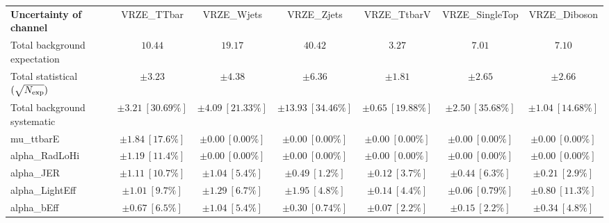 
\begin{sidewaystable}
\begin{center}
\setlength{\tabcolsep}{0.0pc}
\begin{tabular*}{\textwidth}{@{\extracolsep{\fill}}lcccccc}
\noalign{\smallskip}\hline\noalign{\smallskip}
{\bf Uncertainty of channel}                                    & VRZE\_TTbar            & VRZE\_Wjets            & VRZE\_Zjets            & VRZE\_TtbarV            & VRZE\_SingleTop            & VRZE\_Diboson            \\
\noalign{\smallskip}\hline\noalign{\smallskip}
Total background expectation             &  $10.44$        &  $19.17$        &  $40.42$        &  $3.27$        &  $7.01$        &  $7.10$       \\
\noalign{\smallskip}\hline\noalign{\smallskip}
Total statistical $(\sqrt{N_{\rm exp}})$              & $\pm 3.23$        & $\pm 4.38$        & $\pm 6.36$        & $\pm 1.81$        & $\pm 2.65$        & $\pm 2.66$       \\
Total background systematic               & $\pm 3.21\ [30.69\%] $        & $\pm 4.09\ [21.33\%] $        & $\pm 13.93\ [34.46\%] $        & $\pm 0.65\ [19.88\%] $        & $\pm 2.50\ [35.68\%] $        & $\pm 1.04\ [14.68\%] $             \\
\noalign{\smallskip}\hline\noalign{\smallskip}
\noalign{\smallskip}\hline\noalign{\smallskip}
mu\_ttbarE         & $\pm 1.84\ [17.6\%] $          & $\pm 0.00\ [0.00\%] $          & $\pm 0.00\ [0.00\%] $          & $\pm 0.00\ [0.00\%] $          & $\pm 0.00\ [0.00\%] $          & $\pm 0.00\ [0.00\%] $       \\
alpha\_RadLoHi         & $\pm 1.19\ [11.4\%] $          & $\pm 0.00\ [0.00\%] $          & $\pm 0.00\ [0.00\%] $          & $\pm 0.00\ [0.00\%] $          & $\pm 0.00\ [0.00\%] $          & $\pm 0.00\ [0.00\%] $       \\
alpha\_JER         & $\pm 1.11\ [10.7\%] $          & $\pm 1.04\ [5.4\%] $          & $\pm 0.49\ [1.2\%] $          & $\pm 0.12\ [3.7\%] $          & $\pm 0.44\ [6.3\%] $          & $\pm 0.21\ [2.9\%] $       \\
alpha\_LightEff         & $\pm 1.01\ [9.7\%] $          & $\pm 1.29\ [6.7\%] $          & $\pm 1.95\ [4.8\%] $          & $\pm 0.14\ [4.4\%] $          & $\pm 0.06\ [0.79\%] $          & $\pm 0.80\ [11.3\%] $       \\
alpha\_bEff         & $\pm 0.67\ [6.5\%] $          & $\pm 1.04\ [5.4\%] $          & $\pm 0.30\ [0.74\%] $          & $\pm 0.07\ [2.2\%] $          & $\pm 0.15\ [2.2\%] $          & $\pm 0.34\ [4.8\%] $       \\

\end{tabular*}
\end{center}
\end{sidewaystable}
